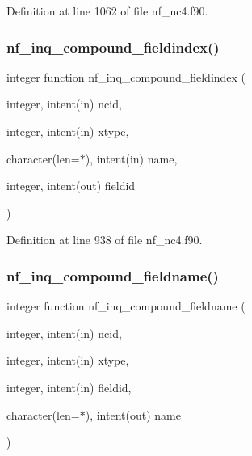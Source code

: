 Definition at line 1062 of file nf\+\_\+nc4.\+f90.

\mbox{\label{nf__nc4_8f90_a91bb477a131a3d0d30500392067fed6c}} 
\subsubsection{\texorpdfstring{nf\+\_\+inq\+\_\+compound\+\_\+fieldindex()}{nf\_inq\_compound\_fieldindex()}}
{\footnotesize\ttfamily integer function nf\+\_\+inq\+\_\+compound\+\_\+fieldindex (\begin{DoxyParamCaption}\item[{integer, intent(in)}]{ncid,  }\item[{integer, intent(in)}]{xtype,  }\item[{character(len=$\ast$), intent(in)}]{name,  }\item[{integer, intent(out)}]{fieldid }\end{DoxyParamCaption})}



Definition at line 938 of file nf\+\_\+nc4.\+f90.

\mbox{\label{nf__nc4_8f90_aa35eb99973113fa518f8f8b408350ed8}} 
\subsubsection{\texorpdfstring{nf\+\_\+inq\+\_\+compound\+\_\+fieldname()}{nf\_inq\_compound\_fieldname()}}
{\footnotesize\ttfamily integer function nf\+\_\+inq\+\_\+compound\+\_\+fieldname (\begin{DoxyParamCaption}\item[{integer, intent(in)}]{ncid,  }\item[{integer, intent(in)}]{xtype,  }\item[{integer, intent(in)}]{fieldid,  }\item[{character(len=$\ast$), intent(out)}]{name }\end{DoxyParamCaption})}



